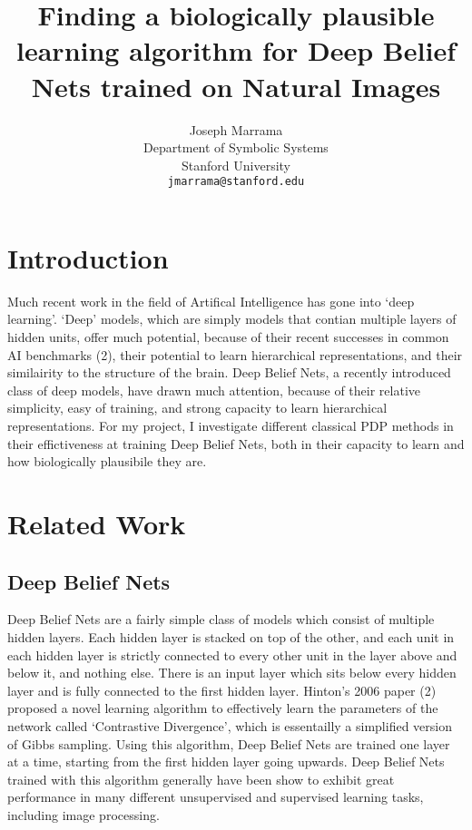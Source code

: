 \documentclass{article} %
\title{Finding a biologically plausible learning algorithm for Deep Belief Nets trained on Natural Images}
\author{
Joseph Marrama \\
Department of Symbolic Systems\\
Stanford University\\
\texttt{jmarrama@stanford.edu} \\
}
\begin{document}
\maketitle

\section{Introduction}

Much recent work in the field of Artifical Intelligence has gone into `deep learning'. `Deep' models, which are simply models that contian multiple layers of hidden units, offer much potential, because of their recent successes in common AI benchmarks (2), their potential to learn hierarchical representations, and their similairity to the structure of the brain. Deep Belief Nets, a recently introduced class of deep models, have drawn much attention, because of their relative simplicity, easy of training, and strong capacity to learn hierarchical representations. For my project, I investigate different classical PDP methods
in their effictiveness at training Deep Belief Nets, both in their capacity to learn and how biologically plausibile they are.


\section{Related Work}

\subsection{Deep Belief Nets}

Deep Belief Nets are a fairly simple class of models which consist of multiple hidden layers. Each hidden layer is stacked on top of the other, and each unit in each hidden layer is strictly connected to every other unit in the layer above and below it, and nothing else. There is an input layer which sits below every hidden layer and is fully connected to the first hidden layer. Hinton's 2006 paper (2) proposed a novel learning algorithm to effectively learn the parameters of the network called `Contrastive Divergence', which is essentailly a simplified version of Gibbs sampling. Using this algorithm, Deep Belief Nets are trained one layer at a time, starting from the first hidden layer going upwards. Deep Belief Nets trained with this algorithm generally have been show to exhibit great performance in many different unsupervised and supervised learning tasks, including image processing.
\end{document}
